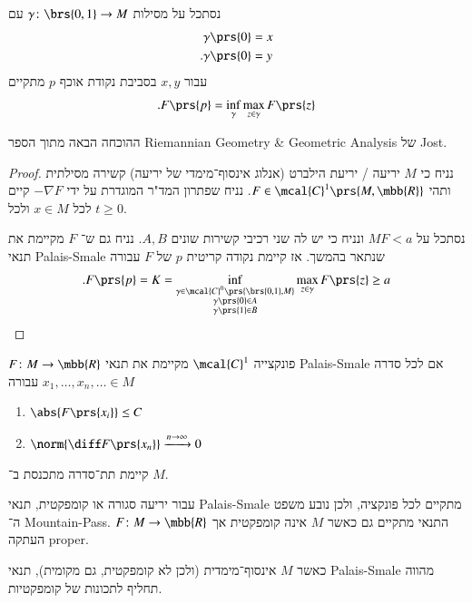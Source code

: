 \documentclass[a4paper,10pt,twoside,openany]{book}
\begin{document}
\begin{theorem}
נסתכל על מסילות
$\gamma \colon \brs{0,1} \to M$
עם
\begin{align*}
\gamma\prs{0} &= x \\
\text{.} \gamma\prs{0} &= y
\end{align*}
עבור
$x,y$
בסביבת נקודת אוכף
$p$
מתקיים
\[\text{.} F\prs{p} = \inf_\gamma \max_{z \in \gamma} F\prs{z}\]
\end{theorem}

ההוכחה הבאה מתוך הספר
\textenglish{Riemannian Geometry \& Geometric Analysis}
של
\textenglish{Jost}.

\begin{proof}
נניח כי
$M$
יריעה / יריעת הילברט (אנלוג אינסוף־מימדי של יריעה) קשירה מסילתית ותהי
$F \in \mcal{C}^1\prs{M,\mbb{R}}$.
נניח שפתרון המד"ר המוגדרת על ידי
$-\nabla F$
קיים לכל
$x \in M$
ולכל
$t \geq 0$.

נסתכל על
$M{F < a}$
ונניח כי יש לה שני רכיבי קשירות שונים
$A,B$.
נניח גם ש־%
$F$
מקיימת את תנאי
\textenglish{Palais-Smale}
שנתאר בהמשך. אז קיימת נקודה קריטית
$p$
של
$F$
עבורה
\[\text{.} F\prs{p} = K = \inf_{\substack{\gamma \in \mcal{C}^0\prs{\brs{0,1}, M} \\ \gamma\prs{0} \in A \\ \gamma\prs{1} \in B}} \max_{z \in \gamma} F\prs{z} \geq a\]
\end{proof}

\begin{definition}
$F \colon M \to \mbb{R}$
פונקצייה
$\mcal{C}^1$
מקיימת את תנאי
\textenglish{Palais-Smale}
אם לכל סדרה
$x_1, \ldots, x_n, \ldots \in M$
עבורה
\begin{enumerate}
\item $\abs{F\prs{x_i}} \leq C$
\item $\norm{\diff F\prs{x_n}} \xrightarrow{n\to\infty} 0$
\end{enumerate}
קיימת תת־סדרה מתכנסת ב־%
$M$.
\end{definition}

\begin{remark}
עבור יריעה סגורה או קומפקטית, תנאי
\textenglish{Palais-Smale}
מתקיים לכל פונקציה, ולכן נובע משפט ה־%
\textenglish{Mountain-Pass}.
התנאי מתקיים גם כאשר
$M$
אינה קומפקטית אך
$F \colon M \to \mbb{R}$
העתקה
\textenglish{proper}.

כאשר
$M$
אינסוף־מימדית (ולכן לא קומפקטית, גם מקומית), תנאי
\textenglish{Palais-Smale}
מהווה תחליף לתכונות של קומפקטיות.
\end{remark}
\end{document}
